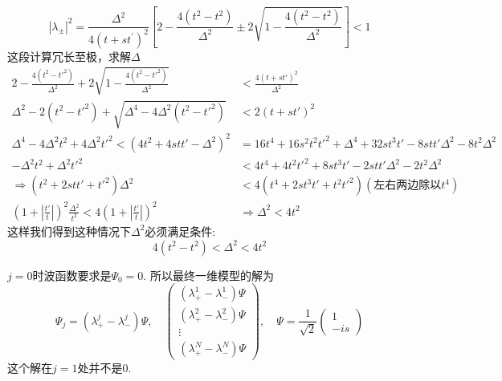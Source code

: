 \documentclass{article}
\numberwithin{equation}{subsection}
\begin{document}
\begin{enumerate}
\begin{equation}
        \left|\lambda_{\pm}\right|^{2}=\frac{\Delta^{2}}{4\left(t+s t^{\prime}\right)^{2}}\left[2-\frac{4\left(t^{2}-t^{2}\right)}{\Delta^{2}} \pm 2 \sqrt{1-\frac{4\left(t^{2}-t^{2}\right)}{\Delta^{2}}}\right]<1
    \end{equation}
    这段计算冗长至极，求解$\Delta$
    \begin{equation}
        \begin{split}
            2-\frac{4(t^2-t'^2)}{\Delta^2}+2\sqrt{1-\frac{4(t^2-t'^2)}{\Delta^2}}&<\frac{4(t+st')^2}{\Delta^2}\\
            \Delta^2-2(t^2-t'^2)+\sqrt{\Delta^4-4\Delta^2(t^2-t'^2)}&<2(t+st')^2\\
            \Delta^4-4\Delta^2t^2+4\Delta^2t'^2<(4t^2+4stt'-\Delta^2)^2&=16t^4+16s^2t^2t'^2+\Delta^4+32st^3t'-8stt'\Delta^2-8t^2\Delta^2\\
            -\Delta^2t^2+\Delta^2t'^2&<4t^4+4t^2t'^2+8st^3t'-2stt'\Delta^2-2t^2\Delta^2\\
            \Longrightarrow(t^2+2stt'+t'^2)\Delta^2&<4(t^4+2st^3t'+t^2t'^2)(\text{左右两边除以$t^4$})\\
            (1+|\frac{t'}{t}|)^2\frac{\Delta^2}{t^2}<4(1+|\frac{t'}{t}|)^2&\Longrightarrow\Delta^2<4t^2
        \end{split}
    \end{equation}
    这样我们得到这种情况下$\Delta^2$必须满足条件:
    \begin{equation}
        4\left(t^{2}-t^{2}\right)<\Delta^{2}<4 t^{2}
    \end{equation}
\end{enumerate}
$j=0$时波函数要求是$\Psi_0=0$. 所以最终一维模型的解为
\begin{equation}
    \Psi_j=(\lambda_+^j-\lambda_-^j)\Psi,\quad\begin{pmatrix}
        (\lambda_+^1-\lambda_-^1)\Psi\\
        (\lambda_+^2-\lambda_-^2)\Psi\\
        \vdots\\
        (\lambda_+^N-\lambda_-^N)\Psi
    \end{pmatrix},\quad \Psi=\frac{1}{\sqrt{2}}\begin{pmatrix}
        1\\
        -is
    \end{pmatrix}
\end{equation}
这个解在$j=1$处并不是$0$.
\end{document}
